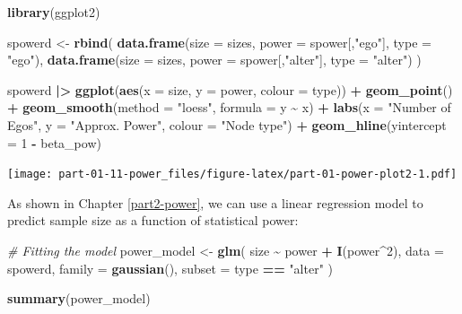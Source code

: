 \documentclass[
]{book}
\newenvironment{Shaded}{\begin{snugshade}}{\end{snugshade}}
\newcommand{\AttributeTok}[1]{\textcolor[rgb]{0.13,0.29,0.53}{#1}}
\newcommand{\CommentTok}[1]{\textcolor[rgb]{0.56,0.35,0.01}{\textit{#1}}}
\newcommand{\DecValTok}[1]{\textcolor[rgb]{0.00,0.00,0.81}{#1}}
\newcommand{\FunctionTok}[1]{\textcolor[rgb]{0.13,0.29,0.53}{\textbf{#1}}}
\newcommand{\NormalTok}[1]{#1}
\newcommand{\OtherTok}[1]{\textcolor[rgb]{0.56,0.35,0.01}{#1}}
\newcommand{\SpecialCharTok}[1]{\textcolor[rgb]{0.81,0.36,0.00}{\textbf{#1}}}
\newcommand{\StringTok}[1]{\textcolor[rgb]{0.31,0.60,0.02}{#1}}
\begin{document}
\begin{Shaded}
\begin{Highlighting}[]
\FunctionTok{library}\NormalTok{(ggplot2)}

\NormalTok{spowerd }\OtherTok{\textless{}{-}} \FunctionTok{rbind}\NormalTok{(}
  \FunctionTok{data.frame}\NormalTok{(}\AttributeTok{size =}\NormalTok{ sizes, }\AttributeTok{power =}\NormalTok{ spower[,}\StringTok{"ego"}\NormalTok{], }\AttributeTok{type =}  \StringTok{"ego"}\NormalTok{),}
  \FunctionTok{data.frame}\NormalTok{(}\AttributeTok{size =}\NormalTok{ sizes, }\AttributeTok{power =}\NormalTok{ spower[,}\StringTok{"alter"}\NormalTok{], }\AttributeTok{type =}  \StringTok{"alter"}\NormalTok{)}
\NormalTok{)}

\NormalTok{spowerd }\SpecialCharTok{|\textgreater{}}
  \FunctionTok{ggplot}\NormalTok{(}\FunctionTok{aes}\NormalTok{(}\AttributeTok{x =}\NormalTok{ size, }\AttributeTok{y =}\NormalTok{ power, }\AttributeTok{colour =}\NormalTok{ type)) }\SpecialCharTok{+}
  \FunctionTok{geom\_point}\NormalTok{() }\SpecialCharTok{+}
  \FunctionTok{geom\_smooth}\NormalTok{(}\AttributeTok{method =} \StringTok{"loess"}\NormalTok{, }\AttributeTok{formula =}\NormalTok{ y }\SpecialCharTok{\textasciitilde{}}\NormalTok{ x) }\SpecialCharTok{+}
  \FunctionTok{labs}\NormalTok{(}\AttributeTok{x =} \StringTok{"Number of Egos"}\NormalTok{, }\AttributeTok{y =} \StringTok{"Approx. Power"}\NormalTok{, }\AttributeTok{colour =} \StringTok{"Node type"}\NormalTok{) }\SpecialCharTok{+}
  \FunctionTok{geom\_hline}\NormalTok{(}\AttributeTok{yintercept =} \DecValTok{1} \SpecialCharTok{{-}}\NormalTok{ beta\_pow)}
\end{Highlighting}
\end{Shaded}

\texttt{[image: part-01-11-power\_files/figure-latex/part-01-power-plot2-1.pdf]}

As shown in Chapter \ref{part2-power}, we can use a linear regression model to predict sample size as a function of statistical power:

\begin{Shaded}
\begin{Highlighting}[]
\CommentTok{\# Fitting the model}
\NormalTok{power\_model }\OtherTok{\textless{}{-}} \FunctionTok{glm}\NormalTok{(}
\NormalTok{  size }\SpecialCharTok{\textasciitilde{}}\NormalTok{ power }\SpecialCharTok{+} \FunctionTok{I}\NormalTok{(power}\SpecialCharTok{\^{}}\DecValTok{2}\NormalTok{),}
  \AttributeTok{data =}\NormalTok{ spowerd, }\AttributeTok{family =} \FunctionTok{gaussian}\NormalTok{(), }\AttributeTok{subset =}\NormalTok{ type }\SpecialCharTok{==} \StringTok{"alter"}
\NormalTok{)}

\FunctionTok{summary}\NormalTok{(power\_model)}
\end{Highlighting}
\end{Shaded}
\end{document}
